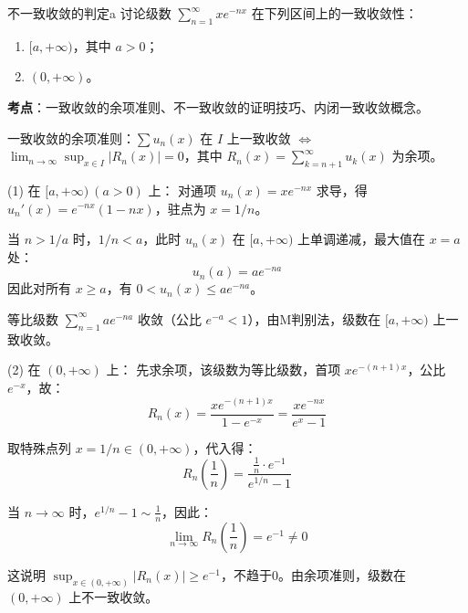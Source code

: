 \documentclass[UTF8,zihao=-4,openany]{ctexbook}
\begin{document}
\begin{example}{不一致收敛的判定}{a}
\noindent 讨论级数 $\displaystyle \sum_{n=1}^{\infty} x e^{-nx}$ 在下列区间上的一致收敛性：
\begin{enumerate}
  \item $[a, +\infty)$，其中 $a > 0$；
  \item $(0, +\infty)$。
\end{enumerate}
\tcblower
\smallskip
\noindent \textbf{考点}：一致收敛的余项准则、不一致收敛的证明技巧、内闭一致收敛概念。

一致收敛的余项准则：$\sum u_n(x)$ 在 $I$ 上一致收敛 $\iff$ $\displaystyle \lim_{n \to \infty} \sup_{x \in I} |R_n(x)| = 0$，其中 $R_n(x) = \sum_{k=n+1}^\infty u_k(x)$ 为余项。

\medskip
(1) 在 $[a, +\infty)\ (a>0)$ 上：
对通项 $u_n(x) = x e^{-nx}$ 求导，得 $u_n'(x) = e^{-nx}(1 - nx)$，驻点为 $x=1/n$。

当 $n > 1/a$ 时，$1/n < a$，此时 $u_n(x)$ 在 $[a, +\infty)$ 上单调递减，最大值在 $x=a$ 处：
$$
u_n(a) = a e^{-n a}
$$
因此对所有 $x \geq a$，有 $0 < u_n(x) \leq a e^{-n a}$。

等比级数 $\sum_{n=1}^\infty a e^{-n a}$ 收敛（公比 $e^{-a} < 1$），由M判别法，级数在 $[a, +\infty)$ 上一致收敛。

\medskip
(2) 在 $(0, +\infty)$ 上：
先求余项，该级数为等比级数，首项 $x e^{-(n+1)x}$，公比 $e^{-x}$，故：
$$
R_n(x) = \frac{x e^{-(n+1)x}}{1 - e^{-x}} = \frac{x e^{-n x}}{e^x - 1}
$$

取特殊点列 $x = 1/n \in (0,+\infty)$，代入得：
$$
R_n\left( \frac{1}{n} \right) = \frac{\frac{1}{n} \cdot e^{-1}}{e^{1/n} - 1}
$$

当 $n \to \infty$ 时，$e^{1/n} - 1 \sim \frac{1}{n}$，因此：
$$
\lim_{n \to \infty} R_n\left( \frac{1}{n} \right) = e^{-1} \neq 0
$$

这说明 $\displaystyle \sup_{x \in (0,+\infty)} |R_n(x)| \geq e^{-1}$，不趋于0。由余项准则，级数在 $(0, +\infty)$ 上不一致收敛。
\end{example}
\end{document}
